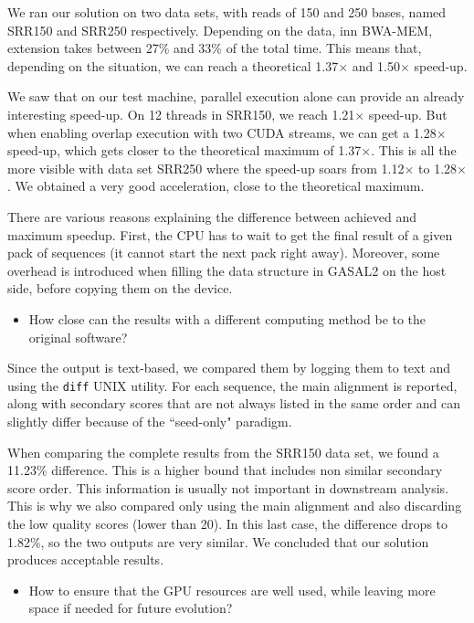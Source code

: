 We ran our solution on two data sets, with reads of 150 and 250 bases, named SRR150 and SRR250 respectively. Depending on the data, inn BWA-MEM, extension takes between 27\% and 33\% of the total time. This means that, depending on the situation, we can reach a theoretical 1.37$\times$ and 1.50$\times$ speed-up.

We saw that on our test machine, parallel execution alone can provide an already interesting speed-up. On 12 threads in SRR150, we reach 1.21$\times$ speed-up. But when enabling overlap execution with two CUDA streams, we can get a 1.28$\times$ speed-up, which gets closer to the theoretical maximum of 1.37$\times$. This is all the more visible with data set SRR250 where the speed-up soars from 1.12$\times$ to 1.28$\times$. We obtained a very good acceleration, close to the theoretical maximum. 

There are various reasons explaining the difference between achieved and maximum speedup. First, the CPU has to wait to get the final result of a given pack of sequences (it cannot start the next pack right away). Moreover, some overhead is introduced when filling the data structure in GASAL2 on the host side, before copying them on the device.

\begin{itemize}
	\item How close can the results with a different computing method be to the original software?
\end{itemize}

Since the output is text-based, we compared them by logging them to text and using the \verb|diff| UNIX utility. For each sequence, the main alignment is reported, along with secondary scores that are not always listed in the same order and can slightly differ because of the ``seed-only" paradigm.

When comparing the complete results from the SRR150 data set, we found a 11.23\% difference. This is a higher bound that includes non similar secondary score order. This information is usually not important in downstream analysis. This is why we also compared only using the main alignment and also discarding the low quality scores (lower than 20). In this last case, the difference drops to 1.82\%, so the two outputs are very similar. We concluded that our solution produces acceptable results.

\begin{itemize}
	\item How to ensure that the GPU resources are well used, while leaving more space if needed for future evolution?
\end{itemize}

